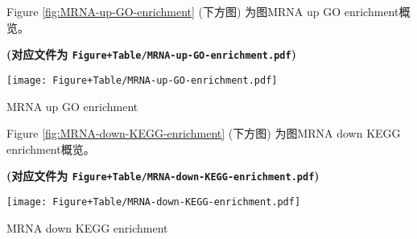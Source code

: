 \documentclass[
]{article}
\begin{document}
\begin{center}\vspace{1.5cm}\end{center}

\begin{center}\vspace{1.5cm}\end{center}

Figure \ref{fig:MRNA-up-GO-enrichment} (下方图) 为图MRNA up GO enrichment概览。

\textbf{(对应文件为 \texttt{Figure+Table/MRNA-up-GO-enrichment.pdf})}

\def\@captype{figure}
\begin{center}
\texttt{[image: Figure+Table/MRNA-up-GO-enrichment.pdf]}
\caption{MRNA up GO enrichment}\label{fig:MRNA-up-GO-enrichment}
\end{center}

\begin{center}\vspace{1.5cm}\end{center}

\begin{center}\vspace{1.5cm}\end{center}

Figure \ref{fig:MRNA-down-KEGG-enrichment} (下方图) 为图MRNA down KEGG enrichment概览。

\textbf{(对应文件为 \texttt{Figure+Table/MRNA-down-KEGG-enrichment.pdf})}

\def\@captype{figure}
\begin{center}
\texttt{[image: Figure+Table/MRNA-down-KEGG-enrichment.pdf]}
\caption{MRNA down KEGG enrichment}\label{fig:MRNA-down-KEGG-enrichment}
\end{center}

\begin{center}\vspace{1.5cm}\end{center}

\begin{center}\vspace{1.5cm}\end{center}
\end{document}
